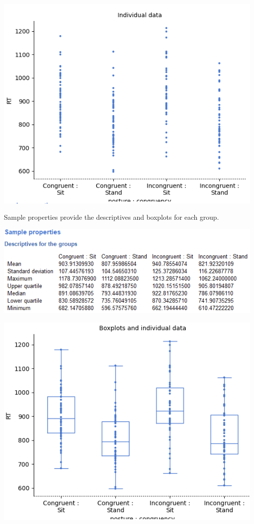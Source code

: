 \documentclass[
]{book}
\begin{document}
\includegraphics{img/ch10/10.3comparegroups_plot.png}

Sample properties provide the descriptives and boxplots for each group.

\includegraphics{img/ch10/10.3comparegroups_descriptives.png}

\includegraphics{img/ch10/10.3comparegroups_boxplot.png}
\end{document}
